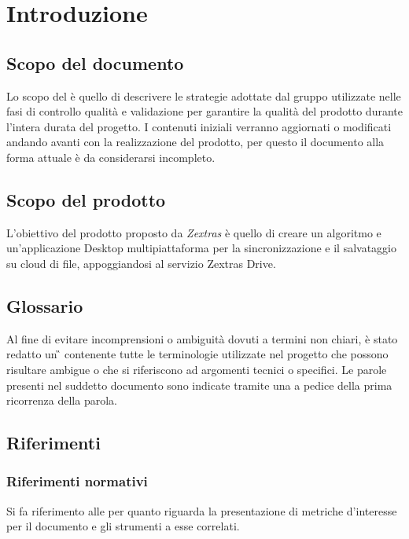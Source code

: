 \section{Introduzione}
\subsection{Scopo del documento}

Lo scopo del  \PdQ{}  è quello di descrivere le strategie adottate dal gruppo \gruppo{} utilizzate nelle fasi di controllo qualità e validazione per garantire la qualità del prodotto durante l'intera durata del progetto.  I contenuti iniziali verranno aggiornati o modificati andando avanti con la realizzazione del prodotto,  per questo il documento alla forma attuale è da considerarsi incompleto.  

\subsection{Scopo del prodotto}

L'obiettivo del prodotto \progetto{} proposto da \textit{Zextras} è quello di creare un algoritmo e un'applicazione Desktop multipiattaforma per la sincronizzazione e il salvataggio su cloud di file,  appoggiandosi al servizio Zextras Drive.  

\subsection{Glossario}

Al fine di evitare incomprensioni o ambiguità dovuti a termini non chiari,  è stato redatto un \G{} contenente tutte le terminologie utilizzate nel progetto che possono risultare ambigue o che si riferiscono ad argomenti tecnici o specifici.  Le parole presenti nel suddetto documento sono indicate tramite una \glo{} a pedice della prima ricorrenza della parola. 

\subsection{Riferimenti}
\subsubsection{Riferimenti normativi}
Si fa riferimento alle \NdP{} per quanto riguarda la presentazione di metriche d'interesse per il documento e gli strumenti a esse correlati. 
